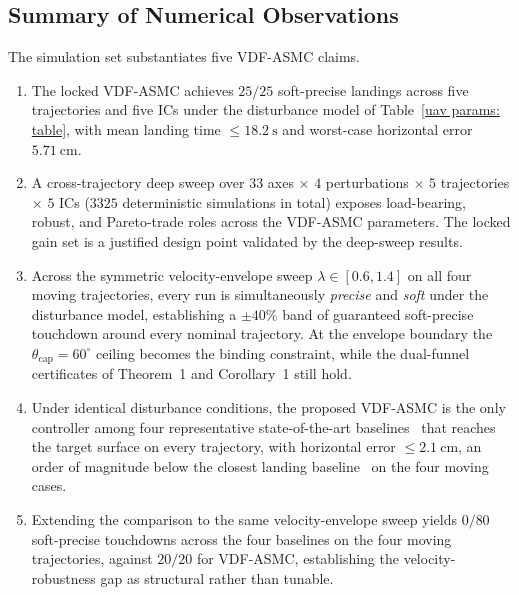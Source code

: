 \documentclass{IEEEtaes}
\begin{document}
\subsection{Summary of Numerical Observations}
\label{summary: subsec}
The simulation set substantiates five VDF-ASMC claims.
\begin{enumerate}
    \item The locked VDF-ASMC achieves $25/25$ soft-precise landings across five trajectories and five ICs under the disturbance model of Table~\ref{uav params: table}, with mean landing time $\le 18.2~\text{s}$ and worst-case horizontal error $5.71~\text{cm}$.
    \item A cross-trajectory deep sweep over $33$ axes $\times$ $4$ perturbations $\times$ $5$ trajectories $\times$ $5$ ICs ($3325$ deterministic simulations in total) exposes load-bearing, robust, and Pareto-trade roles across the VDF-ASMC parameters. The locked gain set is a justified design point validated by the deep-sweep results.
    \item Across the symmetric velocity-envelope sweep $\lambda\in[0.6,1.4]$ on all four moving trajectories, every run is simultaneously \emph{precise} and \emph{soft} under the disturbance model, establishing a $\pm 40\%$ band of guaranteed soft-precise touchdown around every nominal trajectory. At the envelope boundary the $\theta_\text{cap}=60^\circ$ ceiling becomes the binding constraint, while the dual-funnel certificates of Theorem~1 and Corollary~1 still hold.
    \item Under identical disturbance conditions, the proposed VDF-ASMC is the only controller among four representative state-of-the-art baselines~\cite{lin2022,zhang2026,lin2023,cho2022} that reaches the target surface on every trajectory, with horizontal error $\le 2.1~\text{cm}$, an order of magnitude below the closest landing baseline~\cite{zhang2026} on the four moving cases.
    \item Extending the comparison to the same velocity-envelope sweep yields $0/80$ soft-precise touchdowns across the four baselines on the four moving trajectories, against $20/20$ for VDF-ASMC, establishing the velocity-robustness gap as structural rather than tunable.
\end{enumerate}



\end{document}
